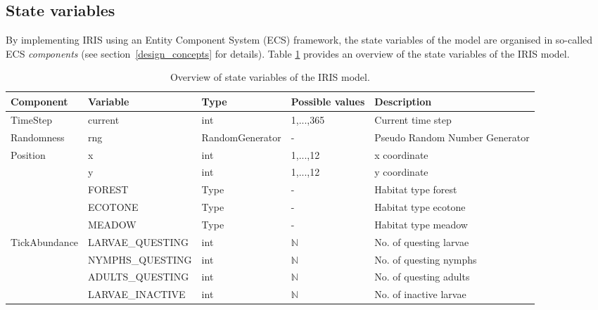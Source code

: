 \documentclass[a4paper, 11pt]{scrartcl}
\begin{document}
\subsection{State variables}
By implementing IRIS using an Entity Component System (ECS) framework, the state variables of the model are organised in so-called ECS \emph{components} (see section~\ref{design_concepts} for details). Table \ref{tab:state_variables} provides an overview of the state variables of the IRIS model.

\begin{table}[H]
\caption[Overview of state variables of the IRIS model.]{Overview of state variables of the IRIS model.}
\label{tab:state_variables}
\begin{tabularx}{\textwidth}{lllll}
\toprule
\textbf{Component} & \textbf{Variable} & \textbf{Type} & \textbf{Possible values} & \textbf{Description} \\
\midrule
\footnotesize{TimeStep} 	& \footnotesize{current} 			& int & 1,...,365 & \footnotesize{Current time step} \\
\footnotesize{Randomness} 	& \footnotesize{rng} 				& \footnotesize{RandomGenerator} & - & \footnotesize{Pseudo Random Number Generator} \\
\multirow{3}{*}{\footnotesize{Position}} & \footnotesize{x}  	& int  & 1,...,12  & \footnotesize{x coordinate} \\
							& \footnotesize{y}    				& int  & 1,...,12 & \footnotesize{y coordinate} \\
\multirow{3}{*}{\footnotesize{Habitat}} & \footnotesize{FOREST} & Type & - & \footnotesize{Habitat type forest} \\
							& \footnotesize{ECOTONE} 			& Type & - & \footnotesize{Habitat type ecotone} \\
							& \footnotesize{MEADOW} 			& Type & - & \footnotesize{Habitat type meadow} \\
\midrule
\multirow{11}{*}{\footnotesize{TickAbundance}} & \footnotesize{LARVAE\_QUESTING}	& int & $\mathbb{N}$ & \footnotesize{No. of questing larvae} \\
							& \footnotesize{NYMPHS\_QUESTING}	& int & $\mathbb{N}$ & \footnotesize{No. of questing nymphs} \\
							& \footnotesize{ADULTS\_QUESTING}	& int & $\mathbb{N}$ & \footnotesize{No. of questing adults} \\
							& \footnotesize{LARVAE\_INACTIVE}	& int & $\mathbb{N}$ & \footnotesize{No. of inactive larvae} \\

\end{tabularx}
\end{table}
\end{document}
